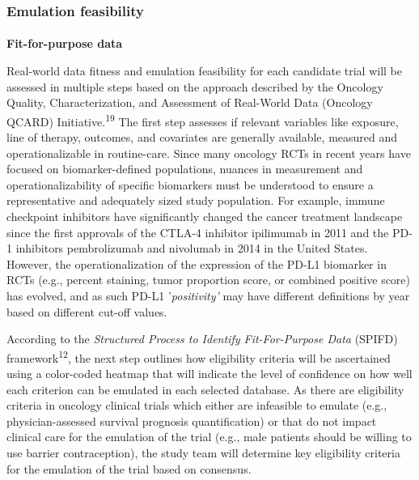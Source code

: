 \documentclass[
  letterpaper,
  DIV=11,
  numbers=noendperiod]{scrartcl}
\makeatletter
\let\oldparagraph\paragraph
\renewcommand{\paragraph}{
    \@ifstar
      \xxxParagraphStar
      \xxxParagraphNoStar
  }
\newcommand{\xxxParagraphStar}[1]{\oldparagraph*{#1}\mbox{}}
\newcommand{\xxxParagraphNoStar}[1]{\oldparagraph{#1}\mbox{}}
\makeatother
\begin{document}
\subsubsection{Emulation feasibility}\label{emulation-feasibility}

\paragraph{\texorpdfstring{\textbf{Fit-for-purpose
data}}{Fit-for-purpose data}}\label{fit-for-purpose-data}

Real-world data fitness and emulation feasibility for each candidate
trial will be assessed in multiple steps based on the approach described
by the Oncology Quality, Characterization, and Assessment of Real-World
Data (Oncology QCARD) Initiative.\textsuperscript{19} The first step
assesses if relevant variables like exposure, line of therapy, outcomes,
and covariates are generally available, measured and operationalizable
in routine-care. Since many oncology RCTs in recent years have focused
on biomarker-defined populations, nuances in measurement and
operationalizability of specific biomarkers must be understood to ensure
a representative and adequately sized study population. For example,
immune checkpoint inhibitors have significantly changed the cancer
treatment landscape since the first approvals of the CTLA-4 inhibitor
ipilimumab in 2011 and the PD-1 inhibitors pembrolizumab and nivolumab
in 2014 in the United States. However, the operationalization of the
expression of the PD-L1 biomarker in RCTs (e.g., percent staining, tumor
proportion score, or combined positive score) has evolved, and as such
PD-L1 '\emph{positivity'} may have different definitions by year based
on different cut-off values.

According to the \emph{Structured Process to Identify Fit-For-Purpose
Data} (SPIFD) framework\textsuperscript{12}, the next step outlines how
eligibility criteria will be ascertained using a color-coded heatmap
that will indicate the level of confidence on how well each criterion
can be emulated in each selected database. As there are eligibility
criteria in oncology clinical trials which either are infeasible to
emulate (e.g., physician-assessed survival prognosis quantification) or
that do not impact clinical care for the emulation of the trial (e.g.,
male patients should be willing to use barrier contraception), the study
team will determine key eligibility criteria for the emulation of the
trial based on consensus.
\end{document}
